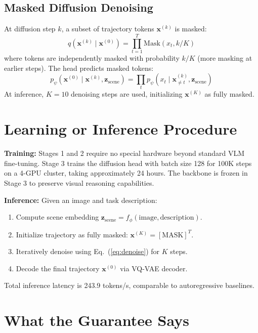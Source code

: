 \documentclass[10pt,twocolumn]{article}
\begin{document}
\subsection*{Masked Diffusion Denoising}

At diffusion step $k$, a subset of trajectory tokens $\mathbf{x}^{(k)}$ is masked:
\begin{equation}
q(\mathbf{x}^{(k)} \mid \mathbf{x}^{(0)}) = \prod_{t=1}^{T} \text{Mask}(x_t, k/K)
\end{equation}
where tokens are independently masked with probability $k/K$ (more masking at earlier steps).
The head predicts masked tokens:
\begin{equation}
p_\psi(\mathbf{x}^{(0)} \mid \mathbf{x}^{(k)}, \mathbf{z}_{\text{scene}}) = \prod_t p_\psi(x_t \mid \mathbf{x}^{(k)}_{\neq t}, \mathbf{z}_{\text{scene}})
\label{eq:denoise}
\end{equation}
At inference, $K=10$ denoising steps are used, initializing $\mathbf{x}^{(K)}$ as fully masked.

\section{Learning or Inference Procedure}

\textbf{Training:}
Stages 1 and 2 require no special hardware beyond standard VLM fine-tuning.
Stage 3 trains the diffusion head with batch size 128 for 100K steps on a 4-GPU cluster, taking approximately 24 hours.
The backbone is frozen in Stage 3 to preserve visual reasoning capabilities.

\textbf{Inference:}
Given an image and task description:
\begin{enumerate}[leftmargin=1.5em,itemsep=1pt]
  \item Compute scene embedding $\mathbf{z}_{\text{scene}} = f_\phi(\text{image}, \text{description})$.
  \item Initialize trajectory as fully masked: $\mathbf{x}^{(K)} = [\text{MASK}]^T$.
  \item Iteratively denoise using Eq.~(\ref{eq:denoise}) for $K$ steps.
  \item Decode the final trajectory $\mathbf{x}^{(0)}$ via VQ-VAE decoder.
\end{enumerate}
Total inference latency is 243.9 tokens/s, comparable to autoregressive baselines.

\section{What the Guarantee Says}
\end{document}

